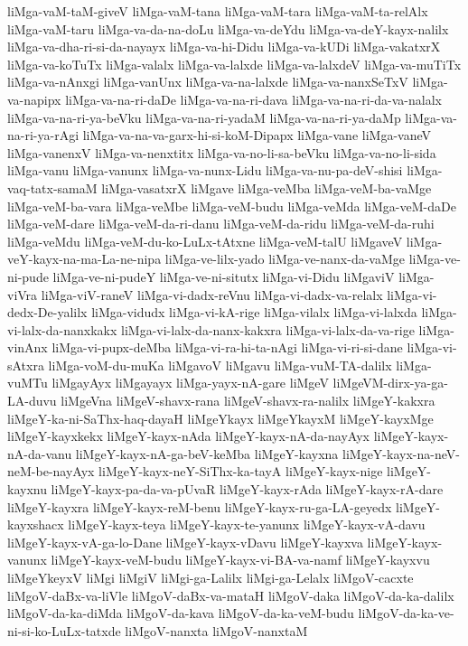 {liMga-vaM-taM-giveV
liMga-vaM-tana
liMga-vaM-tara
liMga-vaM-ta-relAlx
liMga-vaM-taru
liMga-va-da-na-doLu
liMga-va-deYdu
liMga-va-deY-kayx-nalilx
liMga-va-dha-ri-si-da-nayayx
liMga-va-hi-Didu
liMga-va-kUDi
liMga-vakatxrX
liMga-va-koTuTx
liMga-valalx
liMga-va-lalxde
liMga-va-lalxdeV
liMga-va-muTiTx
liMga-va-nAnxgi
liMga-vanUnx
liMga-va-na-lalxde
liMga-va-nanxSeTxV
liMga-va-napipx
liMga-va-na-ri-daDe
liMga-va-na-ri-dava
liMga-va-na-ri-da-va-nalalx
liMga-va-na-ri-ya-beVku
liMga-va-na-ri-yadaM
liMga-va-na-ri-ya-daMp
liMga-va-na-ri-ya-rAgi
liMga-va-na-va-garx-hi-si-koM-Dipapx
liMga-vane
liMga-vaneV
liMga-vanenxV
liMga-va-nenxtitx
liMga-va-no-li-sa-beVku
liMga-va-no-li-sida
liMga-vanu
liMga-vanunx
liMga-va-nunx-Lidu
liMga-va-nu-pa-deV-shisi
liMga-vaq-tatx-samaM
liMga-vasatxrX
liMgave
liMga-veMba
liMga-veM-ba-vaMge
liMga-veM-ba-vara
liMga-veMbe
liMga-veM-budu
liMga-veMda
liMga-veM-daDe
liMga-veM-dare
liMga-veM-da-ri-danu
liMga-veM-da-ridu
liMga-veM-da-ruhi
liMga-veMdu
liMga-veM-du-ko-LuLx-tAtxne
liMga-veM-talU
liMgaveV
liMga-veY-kayx-na-ma-La-ne-nipa
liMga-ve-lilx-yado
liMga-ve-nanx-da-vaMge
liMga-ve-ni-pude
liMga-ve-ni-pudeY
liMga-ve-ni-situtx
liMga-vi-Didu
liMgaviV
liMga-viVra
liMga-viV-raneV
liMga-vi-dadx-reVnu
liMga-vi-dadx-va-relalx
liMga-vi-dedx-De-yalilx
liMga-vidudx
liMga-vi-kA-rige
liMga-vilalx
liMga-vi-lalxda
liMga-vi-lalx-da-nanxkakx
liMga-vi-lalx-da-nanx-kakxra
liMga-vi-lalx-da-va-rige
liMga-vinAnx
liMga-vi-pupx-deMba
liMga-vi-ra-hi-ta-nAgi
liMga-vi-ri-si-dane
liMga-vi-sAtxra
liMga-voM-du-muKa
liMgavoV
liMgavu
liMga-vuM-TA-dalilx
liMga-vuMTu
liMgayAyx
liMgayayx
liMga-yayx-nA-gare
liMgeV
liMgeVM-dirx-ya-ga-LA-duvu
liMgeVna
liMgeV-shavx-rana
liMgeV-shavx-ra-nalilx
liMgeY-kakxra
liMgeY-ka-ni-SaThx-haq-dayaH
liMgeYkayx
liMgeYkayxM
liMgeY-kayxMge
liMgeY-kayxkekx
liMgeY-kayx-nAda
liMgeY-kayx-nA-da-nayAyx
liMgeY-kayx-nA-da-vanu
liMgeY-kayx-nA-ga-beV-keMba
liMgeY-kayxna
liMgeY-kayx-na-neV-neM-be-nayAyx
liMgeY-kayx-neY-SiThx-ka-tayA
liMgeY-kayx-nige
liMgeY-kayxnu
liMgeY-kayx-pa-da-va-pUvaR
liMgeY-kayx-rAda
liMgeY-kayx-rA-dare
liMgeY-kayxra
liMgeY-kayx-reM-benu
liMgeY-kayx-ru-ga-LA-geyedx
liMgeY-kayxshacx
liMgeY-kayx-teya
liMgeY-kayx-te-yanunx
liMgeY-kayx-vA-davu
liMgeY-kayx-vA-ga-lo-Dane
liMgeY-kayx-vDavu
liMgeY-kayxva
liMgeY-kayx-vanunx
liMgeY-kayx-veM-budu
liMgeY-kayx-vi-BA-va-namf
liMgeY-kayxvu
liMgeYkeyxV
liMgi
liMgiV
liMgi-ga-Lalilx
liMgi-ga-Lelalx
liMgoV-cacxte
liMgoV-daBx-va-liVle
liMgoV-daBx-va-mataH
liMgoV-daka
liMgoV-da-ka-dalilx
liMgoV-da-ka-diMda
liMgoV-da-kava
liMgoV-da-ka-veM-budu
liMgoV-da-ka-ve-ni-si-ko-LuLx-tatxde
liMgoV-nanxta
liMgoV-nanxtaM
}
